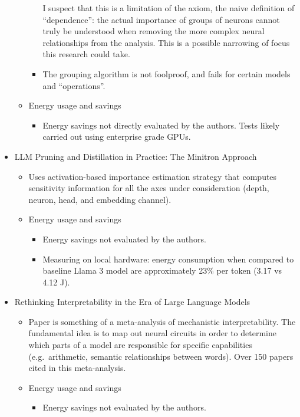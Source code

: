 \begin{itemize}
\begin{itemize}
\begin{itemize}
            I suspect that this is a limitation of the axiom, the naive definition of ``dependence'':
            the actual importance of groups of neurons cannot truly be understood when removing the more complex neural relationships from the analysis.
            This is a possible narrowing of focus this research could take.
            \item The grouping algorithm is not foolproof, and fails for certain models and ``operations''\cite{LLM-Pruner}.
        \end{itemize}
        \item Energy usage and savings
        \begin{itemize}
            \item Energy savings not directly evaluated by the authors.
            Tests likely carried out using enterprise grade GPUs.
        \end{itemize}
    \end{itemize}
    \item LLM Pruning and Distillation in Practice: The Minitron Approach~\cite{sreenivas2024llm}
    \begin{itemize}
        \item Uses activation-based importance estimation strategy that computes sensitivity information for all
        the axes under consideration (depth, neuron, head, and embedding channel).
        \item Energy usage and savings
        \begin{itemize}
            \item Energy savings not evaluated by the authors.
            \item Measuring on local hardware: energy consumption when compared to baseline Llama 3 model are
            approximately 23\% per token (3.17 vs 4.12 J).
        \end{itemize}
    \end{itemize}
    \item Rethinking Interpretability in the Era of Large Language Models ~\cite{singh2024rethinking}
    \begin{itemize}
        \item Paper is something of a meta-analysis of mechanistic interpretability.
        The fundamental idea is to map out neural circuits in order to determine which parts of a model are responsible for specific capabilities (e.g.\ arithmetic, semantic relationships between words).
        Over 150 papers cited in this meta-analysis.
        \item Energy usage and savings
        \begin{itemize}
            \item Energy savings not evaluated by the authors.
        \end{itemize}
    \end{itemize}
\end{itemize}